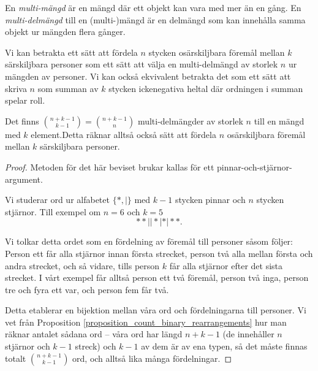 \documentclass[nobib]{tufte-handout}
\begin{document}
\begin{definition}
  En \emph{multi-mängd} är en mängd där ett objekt kan vara med mer än en gång. En \emph{multi-delmängd} till en (multi-)mängd är en delmängd som kan innehålla samma objekt ur mängden flera gånger.

  Vi kan betrakta ett sätt att fördela $n$ stycken osärskiljbara föremål mellan $k$ särskiljbara personer som ett sätt att välja en multi-delmängd av storlek $n$ ur mängden av personer. Vi kan också ekvivalent betrakta det som ett sätt att skriva $n$ som summan av $k$ stycken ickenegativa heltal där ordningen i summan spelar roll.
\end{definition}

\begin{proposition}\label{proposition_indist_objs_dist_persons}
  Det finns $\binom{n+k-1}{k-1} = \binom{n+k-1}{n}$ multi-delmängder av storlek $n$ till en mängd med $k$ element.Detta räknar alltså också sätt att fördela $n$ osärskiljbara föremål mellan $k$ särskiljbara personer.

  \begin{proof}
    Metoden för det här beviset brukar kallas för ett pinnar-och-stjärnor-argument.

    Vi studerar ord ur alfabetet $\{*,|\}$ med $k-1$ stycken pinnar och $n$ stycken stjärnor. Till exempel om $n=6$ och $k=5$
    $$**||*|*|**.$$

    Vi tolkar detta ordet som en fördelning av föremål till personer såsom följer: Person ett får alla  stjärnor innan första strecket, person två alla mellan första och andra strecket, och så vidare, tills person $k$ får alla stjärnor efter det sista strecket. I vårt exempel får alltså person ett två föremål, person två inga, person tre och fyra ett var, och person fem får två.

    Detta etablerar en bijektion mellan våra ord och fördelningarna till personer. Vi vet från Proposition \ref{proposition_count_binary_rearrangements} hur man räknar antalet sådana ord -- våra ord har längd $n + k -1$ (de innehåller $n$ stjärnor och $k-1$ streck) och $k-1$ av dem är av ena typen, så det måste finnas totalt $\binom{n + k - 1}{k - 1}$ ord, och alltså lika många fördelningar.
  \end{proof}
\end{proposition}
\end{document}
